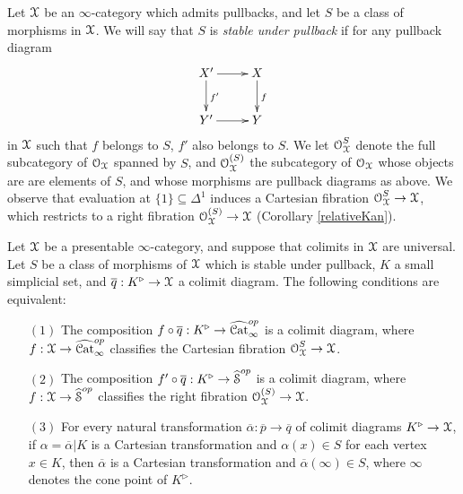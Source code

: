 \begin{notation}\label{ugaboo}
Let $\operatorname{\mathcal{X}}$ be an $\infty$-category which admits pullbacks, and let $S$ be a class of morphisms in $\operatorname{\mathcal{X}}$. We will say that $S$ is {\it stable under pullback} if for any pullback diagram
$$ \xymatrix{ X' \ar[r] \ar[d]^{f'} & X \ar[d]^{f} \\
Y' \ar[r] & Y }$$
in $\operatorname{\mathcal{X}}$ such that $f$ belongs to $S$, $f'$ also belongs to $S$. We let
$\operatorname{\mathcal{O}}_{\operatorname{\mathcal{X}}}^{S}$ denote the full subcategory of $\operatorname{\mathcal{O}}_{\operatorname{\mathcal{X}}}$ spanned by $S$, and
$\operatorname{\mathcal{O}}_{\operatorname{\mathcal{X}}}^{(S)}$ the subcategory of $\operatorname{\mathcal{O}}_{\operatorname{\mathcal{X}}}$ whose objects are 
are elements of $S$, and whose morphisms are pullback diagrams as above.
We observe that evaluation at $\{1\} \subseteq \Delta^1$ induces a Cartesian fibration $\operatorname{\mathcal{O}}_{\operatorname{\mathcal{X}}}^{S} \rightarrow \operatorname{\mathcal{X}}$, which restricts to a right fibration
$\operatorname{\mathcal{O}}_{\operatorname{\mathcal{X}}}^{(S)} \rightarrow \operatorname{\mathcal{X}}$ (Corollary \ref{relativeKan}). 
\end{notation}

\begin{lemma}\label{ib2}
Let $\operatorname{\mathcal{X}}$ be a presentable $\infty$-category, and suppose that colimits in $\operatorname{\mathcal{X}}$ are universal. 
Let $S$ be a class of morphisms of $\operatorname{\mathcal{X}}$ which is stable under pullback, $K$ a small simplicial
set, and $\overline{q}: K^{\triangleright} \rightarrow \operatorname{\mathcal{X}}$ a colimit diagram.
The following conditions are equivalent:
\begin{itemize}
\item[$(1)$] The composition $f \circ \overline{q}: K^{\triangleright} \rightarrow \widehat{\operatorname{\mathcal{C}at}}_{\infty}^{op}$ is a colimit diagram, where $f: \operatorname{\mathcal{X}} \rightarrow \widehat{\operatorname{\mathcal{C}at}}_{\infty}^{op}$
classifies the Cartesian fibration $\operatorname{\mathcal{O}}_{\operatorname{\mathcal{X}}}^{S} \rightarrow \operatorname{\mathcal{X}}$. 

\item[$(2)$] The composition $f' \circ \overline{q}: K^{\triangleright} \rightarrow \widehat{\operatorname{\mathcal{S}}}^{op}$ is a colimit diagram, where $f: \operatorname{\mathcal{X}} \rightarrow \widehat{\operatorname{\mathcal{S}}}^{op}$
classifies the right fibration $\operatorname{\mathcal{O}}_{\operatorname{\mathcal{X}}}^{(S)} \rightarrow \operatorname{\mathcal{X}}$. 

\item[$(3)$] For every natural transformation $\overline{\alpha}: \overline{p} \rightarrow \overline{q}$ of colimit diagrams $K^{\triangleright} \rightarrow \operatorname{\mathcal{X}}$, if $\alpha = \overline{\alpha} | K$ is a Cartesian transformation and $\alpha(x) \in S$ for each vertex $x \in K$, then $\overline{\alpha}$ is a Cartesian transformation and $\overline{\alpha}(\infty) \in S$, where $\infty$ denotes the cone point of $K^{\triangleright}$.
\end{itemize}
\end{lemma}

